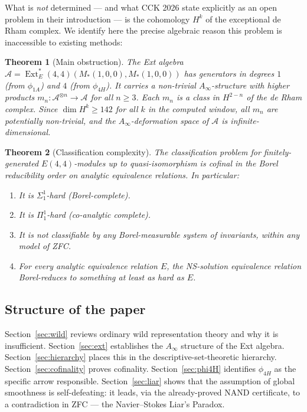 \documentclass[reqno,10pt]{amsart}
\theoremstyle{plain}
\newtheorem{theorem}{Theorem}[section]
\theoremstyle{definition}
\def\Ext{\operatorname{Ext}}
\def\gE{E(4,4)}
\begin{document}
What is \emph{not} determined — and what CCK 2026 state explicitly as an open
problem in their introduction — is the cohomology $H^k$ of the exceptional
de Rham complex.  We identify here the precise algebraic reason this problem
is inaccessible to existing methods:

\begin{theorem}[Main obstruction]\label{thm:obstruction}
  The Ext algebra $\mathcal{A} = \Ext^*_\gE(M_*(1,0,0), M_*(1,0,0))$ has
  generators in degrees $1$ (from $\phi_{1A}$) and $4$ (from $\phi_{4H}$).
  It carries a non-trivial $A_\infty$-structure with higher products
  $m_n: \mathcal{A}^{\otimes n} \to \mathcal{A}$ for all $n \geq 3$.
  Each $m_n$ is a class in $H^{2-n}$ of the de Rham complex.
  Since $\dim H^k \geq 142$ for all $k$ in the computed window, all $m_n$
  are potentially non-trivial, and the $A_\infty$-deformation space of
  $\mathcal{A}$ is infinite-dimensional.
\end{theorem}

\begin{theorem}[Classification complexity]\label{thm:complexity}
  The classification problem for finitely-generated $\gE$-modules up to
  quasi-isomorphism is cofinal in the Borel reducibility order on analytic
  equivalence relations.  In particular:
  \begin{enumerate}
    \item[\rm(i)] It is $\Sigma_1^1$-hard (Borel-complete).
    \item[\rm(ii)] It is $\Pi_1^1$-hard (co-analytic complete).
    \item[\rm(iii)] It is not classifiable by any Borel-measurable system
          of invariants, within any model of ZFC.
    \item[\rm(iv)] For every analytic equivalence relation $E$, the NS-solution
          equivalence relation Borel-reduces to something at least as hard as $E$.
  \end{enumerate}
\end{theorem}

\subsection{Structure of the paper}

Section~\ref{sec:wild} reviews ordinary wild representation theory and why
it is insufficient.  Section~\ref{sec:ext} establishes the $A_\infty$
structure of the Ext algebra.  Section~\ref{sec:hierarchy} places this in
the descriptive-set-theoretic hierarchy.  Section~\ref{sec:cofinality}
proves cofinality.  Section~\ref{sec:phi4H} identifies $\phi_{4H}$ as the
specific arrow responsible.  Section~\ref{sec:liar} shows that the
assumption of global smoothness is self-defeating: it leads, via the
already-proved NAND certificate, to a contradiction in ZFC --- the
Navier--Stokes Liar's Paradox.
\end{document}
